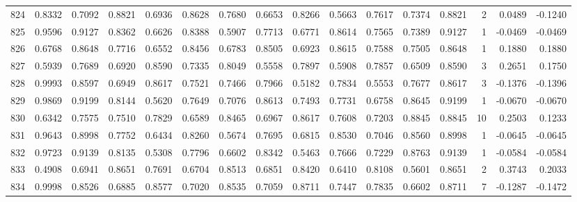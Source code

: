 \begin{tabular}{lrrrrrrrrrrrrrrr}
824 &      0.8332 &  0.7092 &  0.8821 &  0.6936 &  0.8628 &  0.7680 &  0.6653 &  0.8266 &  0.5663 &  0.7617 &   0.7374 &     0.8821 &      2 &                    0.0489 &                    -0.1240 \\
825 &      0.9596 &  0.9127 &  0.8362 &  0.6626 &  0.8388 &  0.5907 &  0.7713 &  0.6771 &  0.8614 &  0.7565 &   0.7389 &     0.9127 &      1 &                   -0.0469 &                    -0.0469 \\
826 &      0.6768 &  0.8648 &  0.7716 &  0.6552 &  0.8456 &  0.6783 &  0.8505 &  0.6923 &  0.8615 &  0.7588 &   0.7505 &     0.8648 &      1 &                    0.1880 &                     0.1880 \\
827 &      0.5939 &  0.7689 &  0.6920 &  0.8590 &  0.7335 &  0.8049 &  0.5558 &  0.7897 &  0.5908 &  0.7857 &   0.6509 &     0.8590 &      3 &                    0.2651 &                     0.1750 \\
828 &      0.9993 &  0.8597 &  0.6949 &  0.8617 &  0.7521 &  0.7466 &  0.7966 &  0.5182 &  0.7834 &  0.5553 &   0.7677 &     0.8617 &      3 &                   -0.1376 &                    -0.1396 \\
829 &      0.9869 &  0.9199 &  0.8144 &  0.5620 &  0.7649 &  0.7076 &  0.8613 &  0.7493 &  0.7731 &  0.6758 &   0.8645 &     0.9199 &      1 &                   -0.0670 &                    -0.0670 \\
830 &      0.6342 &  0.7575 &  0.7510 &  0.7829 &  0.6589 &  0.8465 &  0.6967 &  0.8617 &  0.7608 &  0.7203 &   0.8845 &     0.8845 &     10 &                    0.2503 &                     0.1233 \\
831 &      0.9643 &  0.8998 &  0.7752 &  0.6434 &  0.8260 &  0.5674 &  0.7695 &  0.6815 &  0.8530 &  0.7046 &   0.8560 &     0.8998 &      1 &                   -0.0645 &                    -0.0645 \\
832 &      0.9723 &  0.9139 &  0.8135 &  0.5308 &  0.7796 &  0.6602 &  0.8342 &  0.5463 &  0.7666 &  0.7229 &   0.8763 &     0.9139 &      1 &                   -0.0584 &                    -0.0584 \\
833 &      0.4908 &  0.6941 &  0.8651 &  0.7691 &  0.6704 &  0.8513 &  0.6851 &  0.8420 &  0.6410 &  0.8108 &   0.5601 &     0.8651 &      2 &                    0.3743 &                     0.2033 \\
834 &      0.9998 &  0.8526 &  0.6885 &  0.8577 &  0.7020 &  0.8535 &  0.7059 &  0.8711 &  0.7447 &  0.7835 &   0.6602 &     0.8711 &      7 &                   -0.1287 &                    -0.1472 \\

\end{tabular}
